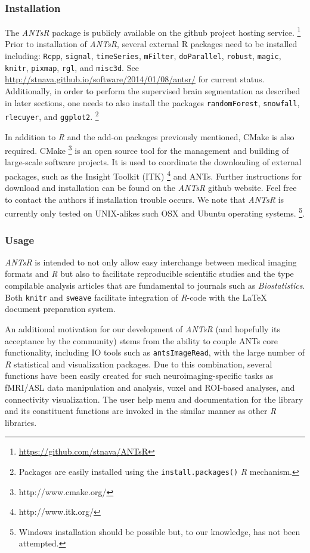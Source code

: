 \documentclass[final,5p,times,twocolumn]{elsarticle}
\begin{document}
\subsubsection{Installation}

The \textit{ANTsR} package is publicly available on the github project hosting service.%
\footnote{
\href{https://github.com/stnava/ANTsR}{https://github.com/stnava/ANTsR}
}
Prior to installation of \textit{ANTsR}, several external R packages
need to be installed including: \verb#Rcpp#, \verb#signal#, \verb#timeSeries#, 
\verb#mFilter#, \verb#doParallel#, \verb#robust#, \verb#magic#, \verb#knitr#, \verb#pixmap#, 
\verb#rgl#, and \verb#misc3d#.  
See \href{http://stnava.github.io/software/2014/01/08/antsr/}{http://stnava.github.io/software/2014/01/08/antsr/} for current status. 
Additionally, in order
to perform the supervised brain segmentation as described 
in later sections, one needs to also install the packages
\verb#randomForest#, \verb#snowfall#, \verb#rlecuyer#,
and \verb#ggplot2#.%
\footnote{
Packages are easily installed using the {\tt install.packages()} \textit{R} mechanism.
} 

In addition to \textit{R} and the add-on packages previously mentioned, CMake is also 
required.  CMake%
\footnote{
http://www.cmake.org/
}
is an open source tool for the management and building of 
large-scale software projects.  It is used
to coordinate the downloading of external packages,
such as the Insight Toolkit (ITK)%
\footnote{
http://www.itk.org/
}
and ANTs.  Further instructions for download and
installation can be found on the \textit{ANTsR} github website.  Feel
free to contact the authors if installation trouble occurs.  We note
that \textit{ANTsR} is currently only tested on UNIX-alikes such OSX and Ubuntu
operating systems.  \footnote{Windows installation should be possible
  but, to our knowledge, has not been attempted.}.

\subsubsection{Usage}
\textit{ANTsR} is intended to not only allow easy interchange between
medical imaging formats and \textit{R} but also to facilitate
reproducible scientific studies and the type compilable analysis
articles that are fundamental to journals such as
\textit{Biostatistics}.  Both \verb#knitr# and \verb#sweave#
facilitate integration of \textit{R}-code with the LaTeX document
preparation system.  

An additional motivation for our development of \textit{ANTsR} (and
hopefully its acceptance by the community) 
stems from the ability to couple ANTs core 
functionality, including IO tools such as \verb#antsImageRead#, 
with the large number of \textit{R} statistical and
visualization packages.  Due to this combination, several
functions have been easily created for such neuroimaging-specific 
tasks as fMRI/ASL data manipulation and analysis,
voxel and ROI-based  analyses,
and connectivity visualization. %
The user help menu and documentation for the library  and its
constituent functions are invoked in the similar manner as other
\textit{R} libraries.
\end{document}
